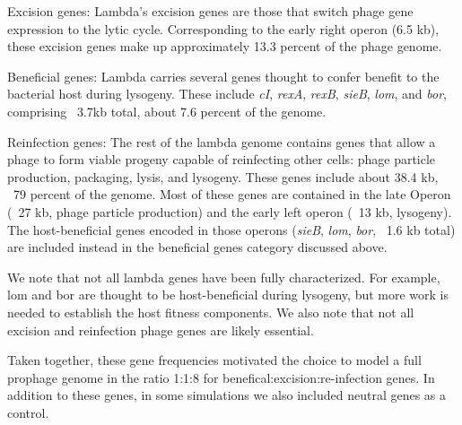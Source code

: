 Excision genes: Lambda's excision genes are those that switch phage gene expression to the lytic cycle. Corresponding to the early right operon (6.5 kb), these excision genes make up approximately 13.3 percent of the phage genome.

Beneficial genes: Lambda carries several genes thought to confer benefit to the bacterial host during lysogeny. These include \emph{cI}, \emph{rexA}, \emph{rexB}, \emph{sieB}, \emph{lom}, and \emph{bor}, comprising ~3.7kb total, about 7.6 percent of the genome.

Reinfection genes: The rest of the lambda genome contains genes that allow a phage to form viable progeny capable of reinfecting other cells: phage particle production, packaging, lysis, and lysogeny. These genes include about 38.4 kb, ~79 percent of the genome. Most of these genes are contained in the late Operon (~27 kb, phage particle production) and the early left operon (~13 kb, lysogeny). The host-beneficial genes encoded in those operons (\emph{sieB}, \emph{lom}, \emph{bor}, ~1.6 kb total) are included instead in the beneficial genes category discussed above.

We note that not all lambda genes have been fully characterized. For example, lom and bor are thought to be host-beneficial during lysogeny, but more work is needed to establish the host fitness components. We also note that not all excision and reinfection phage genes are likely essential.

Taken together, these gene frequencies motivated the choice to model a full prophage genome in the ratio 1:1:8 for benefical:excision:re-infection genes.  In addition to these genes, in some simulations we also included neutral genes as a control. 
